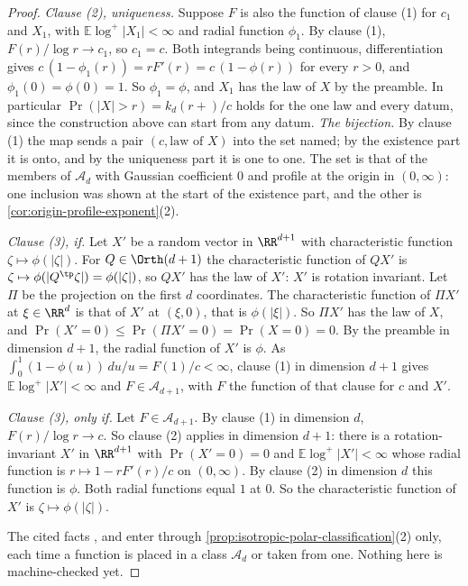 \begin{proof}
\emph{Clause (2), uniqueness.} Suppose $F$ is also the function of clause (1) for $c_1$ and
$X_1$, with $\mathbb{E}\log^+|X_1| < \infty$ and radial function $\phi_1$. By clause (1),
$F(r)/\log r \to c_1$, so $c_1 = c$. Both integrands being continuous, differentiation gives
$c\,(1 - \phi_1(r)) = rF'(r) = c\,(1 - \phi(r))$ for every $r > 0$, and
$\phi_1(0) = \phi(0) = 1$. So $\phi_1 = \phi$, and $X_1$ has the law of $X$ by the preamble. In
particular $\Pr(|X| > r) = k_d(r{+})/c$ holds for the one law and every datum, since the
construction above can start from any datum. \emph{The bijection.} By clause (1) the map sends a
pair $(c, \text{law of } X)$ into the set named; by the existence part it is onto, and by the
uniqueness part it is one to one. The set is that of the members of $\mathcal{A}_d$ with
Gaussian coefficient $0$ and profile at the origin in $(0,\infty)$: one inclusion was shown at
the start of the existence part, and the other is \ref{cor:origin-profile-exponent}(2).

\emph{Clause (3), if.} Let $X'$ be a random vector in $\RR^{d+1}$ with characteristic function
$\zeta \mapsto \phi(|\zeta|)$. For $Q \in \Orth(d+1)$ the characteristic function of $QX'$ is
$\zeta \mapsto \phi(|Q^{\tp}\zeta|) = \phi(|\zeta|)$, so $QX'$ has the law of $X'$: $X'$ is
rotation invariant. Let $\Pi$ be the projection on the first $d$ coordinates. The characteristic
function of $\Pi X'$ at $\xi \in \RR^d$ is that of $X'$ at $(\xi,0)$, that is $\phi(|\xi|)$. So
$\Pi X'$ has the law of $X$, and $\Pr(X' = 0) \le \Pr(\Pi X' = 0) = \Pr(X = 0) = 0$. By the
preamble in dimension $d + 1$, the radial function of $X'$ is $\phi$. As
$\int_0^1(1 - \phi(u))\,du/u = F(1)/c < \infty$, clause (1) in dimension $d + 1$ gives
$\mathbb{E}\log^+|X'| < \infty$ and $F \in \mathcal{A}_{d+1}$, with $F$ the function of that
clause for $c$ and $X'$.

\emph{Clause (3), only if.} Let $F \in \mathcal{A}_{d+1}$. By clause (1) in dimension $d$,
$F(r)/\log r \to c$. So clause (2) applies in dimension $d + 1$: there is a rotation-invariant
$X'$ in $\RR^{d+1}$ with $\Pr(X' = 0) = 0$ and $\mathbb{E}\log^+|X'| < \infty$ whose radial
function is $r \mapsto 1 - rF'(r)/c$ on $(0,\infty)$. By clause (2) in dimension $d$ this
function is $\phi$. Both radial functions equal $1$ at $0$. So the characteristic function of
$X'$ is $\zeta \mapsto \phi(|\zeta|)$.

The cited facts ,  and  enter through
\ref{prop:isotropic-polar-classification}(2) only, each time a function is placed in a class
$\mathcal{A}_d$ or taken from one. Nothing here is machine-checked yet.
\end{proof}

